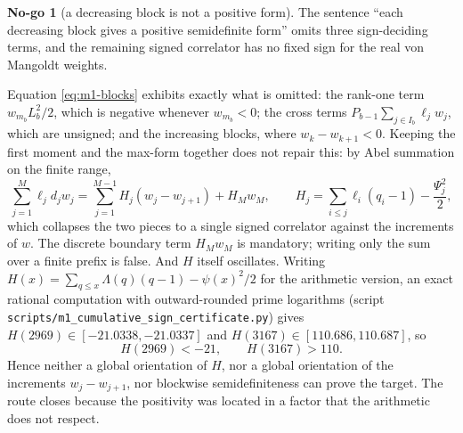 \documentclass[11pt]{amsart}
\theoremstyle{definition}
\theoremstyle{remark}
\theoremstyle{definition}
\newtheorem{nogo}{No-go}[section]
\begin{document}
\begin{nogo}[a decreasing block is not a positive form]\label{ng:m1-local}
The sentence ``each decreasing block gives a positive semidefinite form'' omits three
sign-deciding terms, and the remaining signed correlator has no fixed sign for the real von
Mangoldt weights.
\end{nogo}

\noindent Equation \eqref{eq:m1-blocks} exhibits exactly what is omitted: the rank-one term
$w_{m_b}L_b^2/2$, which is negative whenever $w_{m_b}<0$; the cross terms
$P_{b-1}\sum_{j\in I_b}\ell_jw_j$, which are unsigned; and the increasing blocks, where
$w_k-w_{k+1}<0$. Keeping the first moment and the max-form together does not repair this: by
Abel summation on the finite range,
\begin{equation}\label{eq:m1-abel}
   \sum_{j=1}^M\ell_jd_jw_j=\sum_{j=1}^{M-1}H_j(w_j-w_{j+1})+H_Mw_M,
   \qquad H_j=\sum_{i\le j}\ell_i(q_i-1)-\frac{\Psi_j^2}{2},
\end{equation}
which collapses the two pieces to a single signed correlator against the increments of $w$. The
discrete boundary term $H_Mw_M$ is mandatory; writing only the sum over a finite prefix is
false. And $H$ itself oscillates. Writing
$H(x)=\sum_{q\le x}\Lambda(q)(q-1)-\psi(x)^2/2$ for the arithmetic version, an exact rational
computation with outward-rounded prime logarithms (script
\texttt{scripts/m1\_cumulative\_sign\_certificate.py}) gives $H(2969)\in[-21.0338,-21.0337]$ and
$H(3167)\in[110.686,110.687]$, so
\begin{equation}\label{eq:H-witness}
   H(2969)<-21,\qquad H(3167)>110 .
\end{equation}
Hence neither a global orientation of $H$, nor a global orientation of the increments
$w_j-w_{j+1}$, nor blockwise semidefiniteness can prove the target. The route closes because the
positivity was located in a factor that the arithmetic does not respect.
\end{document}
